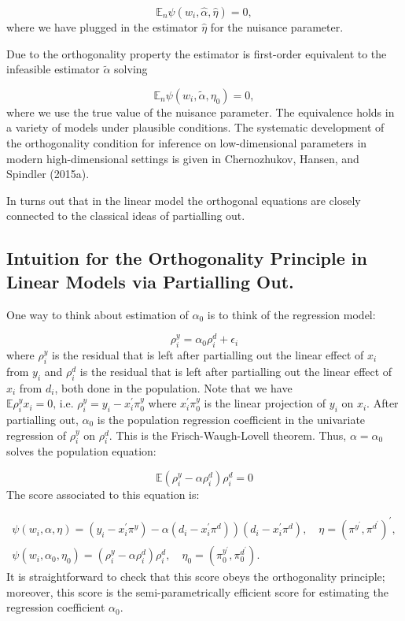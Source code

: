 \documentclass[12pt,a4paper]{article}
\begin{document}
\[
\mathbb E_n \psi(w_i, \hat\alpha, \hat\eta) = 0,
\]
where we have plugged in the estimator $\hat \eta$ for the nuisance parameter.

Due to the orthogonality property the estimator is first-order equivalent to the infeasible estimator $\tilde{\alpha}$ solving

\[
\mathbb E_n \psi(w_i, \tilde\alpha, \eta_0) = 0,
\]
where we use the true value of the nuisance parameter. The equivalence holds in a variety of models under plausible conditions. The systematic development of the orthogonality condition for inference on low-dimensional parameters in modern high-dimensional settings is given in  Chernozhukov, Hansen, and Spindler (2015a).

In turns out that in the linear model the orthogonal equations are closely connected to the classical ideas of partialling out.

\subsection{Intuition for the Orthogonality Principle in Linear Models via Partialling Out.}
One way to think about estimation of $\alpha_0$ is to think of the regression model:

\[
\rho_i^y=\alpha_0 \rho_i^d+\epsilon_i
\]
where $\rho_i^y$ is the residual that is left after partialling out the linear effect of $x_i$ from $y_i$ and $\rho_i^d$ is the residual that is left after partialling out the linear effect of $x_i$ from $d_i$, both done in the population. Note that we have $\mathbb{E} \rho_i^y x_i=0 \text {, i.e. } \rho_i^y=y_i-x_i^{\prime} \pi_0^y$ where $x_i^{\prime} \pi_0^y$ is the linear projection of $y_i$ on $x_i$. After partialling out, $\alpha_0$ is the population regression coefficient in the univariate regression of $\rho^y_i$ on $\rho^d_i$. This is the Frisch-Waugh-Lovell theorem. Thus, $\alpha = \alpha_0$ solves the population equation:

\[
\mathbb{E}\left(\rho_i^y-\alpha \rho_i^d\right) \rho_i^d=0
\]
The score associated to this equation is:

\[
\begin{gathered}
\left.\psi\left(w_i, \alpha, \eta\right)=\left(y_i-x_i^{\prime} \pi^y\right)-\alpha\left(d_i-x_i^{\prime} \pi^d\right)\right)\left(d_i-x_i^{\prime} \pi^d\right), \quad \eta=\left(\pi^{y^{\prime}}, \pi^{d^{\prime}}\right)^{\prime}, \\
\psi\left(w_i, \alpha_0, \eta_0\right)=\left(\rho_i^y-\alpha \rho_i^d\right) \rho_i^d, \quad \eta_0=\left(\pi_0^{y^{\prime}}, \pi_0^{d^{\prime}}\right) .
\end{gathered}
\]
It is straightforward to check that this score obeys the orthogonality principle; moreover, this score is the semi-parametrically efficient score for estimating the regression coefficient $\alpha_0$.
\end{document}
